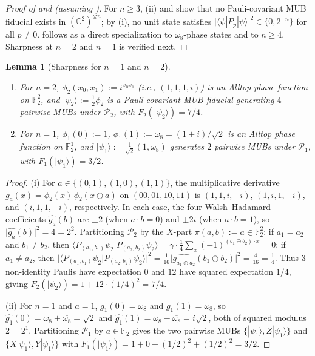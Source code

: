 \documentclass[11pt,a4paper]{article}
\theoremstyle{plain}
\newtheorem{lemma}{Lemma}[section]
\theoremstyle{definition}
\theoremstyle{remark}
\newcommand{\C}{\mathbb{C}}
\newcommand{\F}{\mathbb{F}}
\newcommand{\Pauli}{\mathcal{P}}
\newcommand{\ket}[1]{|#1\rangle}
\newcommand{\braket}[2]{\langle#1|#2\rangle}
\newcommand{\expval}[2]{\langle#1|#2|#1\rangle}
\newcommand{\abs}[1]{\lvert#1\rvert}
\numberwithin{equation}{section}
\begin{document}
\begin{proof}[Proof of  and  (assuming )]
For $n \ge 3$, (ii) and  show that no Pauli-covariant MUB fiducial exists in $(\C^2)^{\otimes n}$; by (i), no unit state satisfies $\abs{\expval{\psi}{P_p}}^2 \in \{0, 2^{-n}\}$ for all $p \neq 0$.  follows as a direct specialization to $\omega_8$-phase states and to $n \ge 4$. Sharpness at $n = 2$ and $n = 1$ is verified next.
\end{proof}

\begin{lemma}[Sharpness for $n = 1$ and $n = 2$]\label{lem:sharpness}
\leavevmode
\begin{enumerate}[label=(\roman*),leftmargin=2em]
  \item For $n = 2$, $\phi_2(x_0, x_1) := i^{x_0 x_1}$ (i.e., $(1, 1, 1, i)$) is an Alltop phase function on $\F_2^2$, and $\ket{\psi_2} := \frac{1}{2}\phi_2$ is a Pauli-covariant MUB fiducial generating $4$ pairwise MUBs under $\Pauli_2$, with $F_2(\ket{\psi_2}) = 7/4$.
  \item For $n = 1$, $\phi_1(0) := 1$, $\phi_1(1) := \omega_8 = (1+i)/\sqrt{2}$ is an Alltop phase function on $\F_2^1$, and $\ket{\psi_1} := \frac{1}{\sqrt{2}}(1, \omega_8)$ generates $2$ pairwise MUBs under $\Pauli_1$, with $F_1(\ket{\psi_1}) = 3/2$.
\end{enumerate}
\end{lemma}

\begin{proof}
(i) For $a \in \{(0,1), (1,0), (1,1)\}$, the multiplicative derivative $g_a(x) = \overline{\phi_2(x)}\,\phi_2(x \oplus a)$ on $(00, 01, 10, 11)$ is $(1, 1, i, -i)$, $(1, i, 1, -i)$, and $(i, 1, 1, -i)$, respectively. In each case, the four Walsh--Hadamard coefficients $\widehat{g_a}(b)$ are $\pm 2$ (when $a \cdot b = 0$) and $\pm 2i$ (when $a \cdot b = 1$), so $\abs{\widehat{g_a}(b)}^2 = 4 = 2^2$. Partitioning $\Pauli_2$ by the $X$-part $\pi(a, b) := a \in \F_2^2$: if $a_1 = a_2$ and $b_1 \neq b_2$, then $\braket{P_{(a_1,b_1)}\psi_2}{P_{(a_2,b_2)}\psi_2} = \gamma \cdot \frac{1}{4}\sum_x (-1)^{(b_1 \oplus b_2)\cdot x} = 0$; if $a_1 \neq a_2$, then $\abs{\braket{P_{(a_1,b_1)}\psi_2}{P_{(a_2,b_2)}\psi_2}}^2 = \frac{1}{16}\abs{\widehat{g_{a_1\oplus a_2}}(b_1\oplus b_2)}^2 = \frac{4}{16} = \frac{1}{4}$. Thus $3$ non-identity Paulis have expectation $0$ and $12$ have squared expectation $1/4$, giving $F_2(\ket{\psi_2}) = 1 + 12 \cdot (1/4)^2 = 7/4$.

(ii) For $n = 1$ and $a = 1$, $g_1(0) = \omega_8$ and $g_1(1) = \overline{\omega_8}$, so $\widehat{g_1}(0) = \omega_8 + \overline{\omega_8} = \sqrt{2}$ and $\widehat{g_1}(1) = \omega_8 - \overline{\omega_8} = i\sqrt{2}$, both of squared modulus $2 = 2^1$. Partitioning $\Pauli_1$ by $a \in \F_2$ gives the two pairwise MUBs $\{\ket{\psi_1}, Z\ket{\psi_1}\}$ and $\{X\ket{\psi_1}, Y\ket{\psi_1}\}$ with $F_1(\ket{\psi_1}) = 1 + 0 + (1/2)^2 + (1/2)^2 = 3/2$.
\end{proof}
\end{document}
